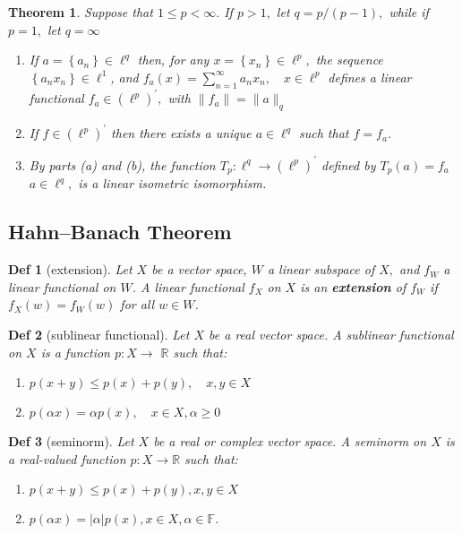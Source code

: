 \documentclass[10pt]{paper}
\newtheorem{theorem}{Theorem}[section]
\newtheorem{definition}{Def}[section]
\begin{document}
\begin{theorem}
    Suppose that $1 \leq p<\infty .$ If $p>1,$ let $q=p /(p-1),$ while if $p=1,$ let $q=\infty$
    \begin{enumerate}
        \item If $a=\left\{a_{n}\right\} \in \ell^{q}$ then, for any $x=\left\{x_{n}\right\} \in \ell^{p},$ the sequence $\left\{a_{n} x_{n}\right\} \in \ell^{1}$, and $f_{a}(x)=\sum_{n=1}^{\infty} a_{n} x_{n}, \quad x \in \ell^{p}$
              defines a linear functional $f_{a} \in\left(\ell^{p}\right)^{\prime},$ with $\left\|f_{a}\right\|=\|a\|_{q}$
        \item If $f \in\left(\ell^{p}\right)^{\prime}$ then there exists a unique $a \in \ell^{q}$ such that $f=f_{a}$.
        \item By parts (a) and (b), the function $T_{p}: \ell^{q} \rightarrow\left(\ell^{p}\right)^{\prime}$ defined by $T_{p}(a)=f_{a}$ $a \in \ell^{q},$ is a linear isometric isomorphism.
    \end{enumerate}
\end{theorem}

\subsection{Hahn–Banach Theorem}

\begin{definition}[extension]
    Let $X$ be a vector space, $W$ a linear subspace of $X,$ and $f_{W}$ a linear functional on $W$. A linear functional $f_{X}$ on $X$ is an \textbf{extension} of $f_{W}$ if $f_{X}(w)=f_{W}(w)$ for all $w \in W$.
\end{definition}

\begin{definition}[sublinear functional]
    Let $X$ be a real vector space. A sublinear functional on $X$ is a function $p: X \rightarrow$ $\mathbb{R}$ such that:
    \begin{enumerate}
        \item $p(x+y) \leq p(x)+p(y), \quad x, y \in X$
        \item $p(\alpha x)=\alpha p(x), \quad x \in X, \alpha \geq 0$
    \end{enumerate}
\end{definition}

\begin{definition}[seminorm]
    Let $X$ be a real or complex vector space. A seminorm on $X$ is a real-valued function $p: X \rightarrow \mathbb{R}$ such that:
    \begin{enumerate}
        \item $p(x+y) \leq p(x)+p(y), x, y \in X$
        \item $p(\alpha x)=|\alpha| p(x), x \in X, \alpha \in \mathbb{F}$.
    \end{enumerate}
\end{definition}
\end{document}
